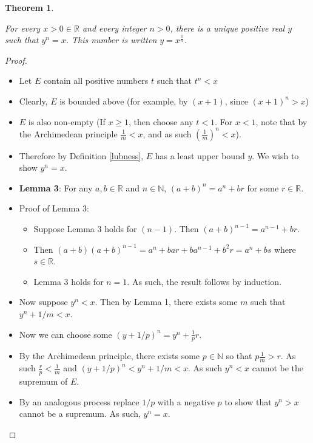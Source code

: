 \documentclass[12pt]{article}
\newtheorem{theorem}{Theorem}[section]
\newcommand{\R}{\mathbb{R}}
\newcommand{\N}{\mathbb{N}}
\begin{document}
\begin{theorem}
    
    \label{power}
    
    For every $x > 0 \in \R$ and every integer $n > 0$, there is a unique positive real $y$ such that $y^n = x$. This number is written $y = x^{\frac{1}{n}}$.
    
\end{theorem}

\begin{proof}
    \begin{itemize}
        \item Let $E$ contain all positive numbers $t$ such that $t^n < x$
        \item Clearly, $E$ is bounded above (for example, by $(x+1)$, since $(x+1)^n > x$)
        \item $E$ is also non-empty (If $x\geq1$, then choose any $t < 1$. For $x < 1$, note that by the Archimedean principle $\frac{1}{m} < x$, and as such  $(\frac{1}{m})^n < x$).
        \item Therefore by Definition \ref{lubness}, $E$ has a least upper bound $y$. We wish to show $y^n = x$.
        \item \textbf{Lemma 3}: For any $a, b \in \R$ and $n \in \N$, $(a+b)^n = a^n + br$ for some $r \in \R$.
        \item Proof of Lemma 3:
            \begin{itemize}
                \item Suppose Lemma 3 holds for $(n-1)$. Then $(a+b)^{n-1} = a^{n-1} + br$.
                \item Then $(a+b)(a+b)^{n-1} = a^n + bar + ba^{n-1} + b^2r = a^n + bs$ where $s \in \R$.
                \item Lemma 3 holds for $n = 1$. As such, the result follows by induction.
            \end{itemize}
        \item Now suppose $y^n < x$. Then by Lemma 1, there exists some $m$ such that $y^n + 1/m < x$.
        \item Now we can choose some $(y+1/p)^n = y^n + \frac{1}{p} r$.
        \item By the Archimedean principle, there exists some $p \in \N$ so that $p \frac{1}{m} > r$. As such $\frac{r}{p}<\frac{1}{m}$ and $(y+1/p)^n < y^n + 1/m < x$. As such $y^n < x$ cannot be the supremum of $E$.
        \item By an analogous process replace $1/p$ with a negative $p$ to show that $y^n > x$ cannot be a supremum. As such, $y^n = x$.
    \end{itemize}
\end{proof}
\end{document}
